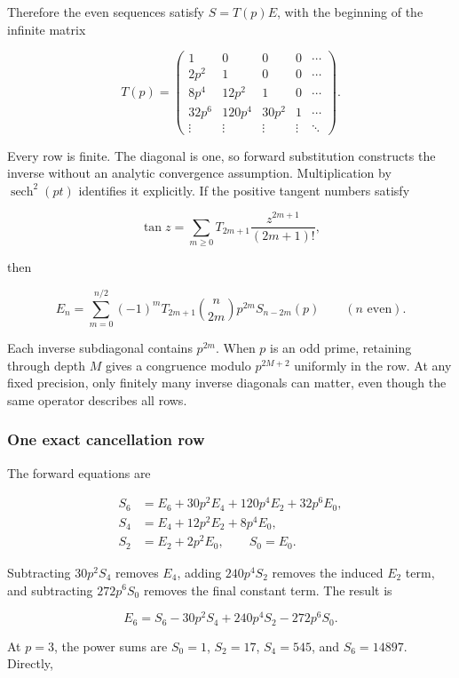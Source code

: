 \documentclass[11pt,letterpaper]{article}
\begin{document}
Therefore the even sequences satisfy \(S=T(p)E\), with the beginning of the infinite matrix

\[
T(p)=
\begin{pmatrix}
1&0&0&0&\cdots\\
2p^2&1&0&0&\cdots\\
8p^4&12p^2&1&0&\cdots\\
32p^6&120p^4&30p^2&1&\cdots\\
\vdots&\vdots&\vdots&\vdots&\ddots
\end{pmatrix}.
\]

Every row is finite. The diagonal is one, so forward substitution constructs the inverse without an analytic convergence assumption. Multiplication by \(\operatorname{sech}^2(pt)\) identifies it explicitly. If the positive tangent numbers satisfy

\[
\tan z=\sum_{m\ge0}T_{2m+1}\frac{z^{2m+1}}{(2m+1)!},
\]

then

\[
\boxed{
E_n=\sum_{m=0}^{n/2}(-1)^mT_{2m+1}
\binom n{2m}p^{2m}S_{n-2m}(p)
}\qquad(n\text{ even}).
\]

Each inverse subdiagonal contains \(p^{2m}\). When \(p\) is an odd prime, retaining through depth \(M\) gives a congruence modulo \(p^{2M+2}\) uniformly in the row. At any fixed precision, only finitely many inverse diagonals can matter, even though the same operator describes all rows.

\subsubsection{One exact cancellation row}\label{one-exact-cancellation-row}

The forward equations are

\[
\begin{aligned}
S_6&=E_6+30p^2E_4+120p^4E_2+32p^6E_0,\\
S_4&=E_4+12p^2E_2+8p^4E_0,\\
S_2&=E_2+2p^2E_0,\qquad S_0=E_0.
\end{aligned}
\]

Subtracting \(30p^2S_4\) removes \(E_4\), adding \(240p^4S_2\) removes the induced \(E_2\) term, and subtracting \(272p^6S_0\) removes the final constant term. The result is

\[
\boxed{E_6=S_6-30p^2S_4+240p^4S_2-272p^6S_0.}
\]

At \(p=3\), the power sums are \(S_0=1\), \(S_2=17\), \(S_4=545\), and \(S_6=14897\). Directly,
\end{document}
